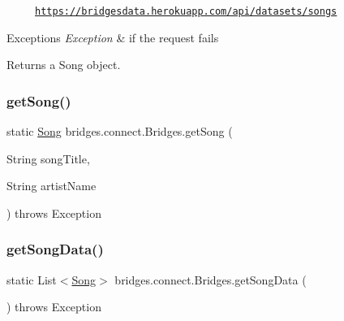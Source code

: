 ~~~~~\href{https://bridgesdata.herokuapp.com/api/datasets/songs}{\tt https\+://bridgesdata.\+herokuapp.\+com/api/datasets/songs} 


\begin{DoxyExceptions}{Exceptions}
{\em Exception} & if the request fails\\
\hline
\end{DoxyExceptions}
\begin{DoxyReturn}{Returns}
a Song object. 
\end{DoxyReturn}
\mbox{\label{classbridges_1_1connect_1_1_bridges_ae7621c3cfd9978aa02fe243317cf0cca}} 
\subsubsection{\texorpdfstring{get\+Song()}{getSong()}\hspace{0.1cm}{\footnotesize\ttfamily [2/2]}}
{\footnotesize\ttfamily static \mbox{\hyperlink{classbridges_1_1data__src__dependent_1_1_song}{Song}} bridges.\+connect.\+Bridges.\+get\+Song (\begin{DoxyParamCaption}\item[{String}]{song\+Title,  }\item[{String}]{artist\+Name }\end{DoxyParamCaption}) throws Exception\hspace{0.3cm}{\ttfamily [static]}}

\mbox{\label{classbridges_1_1connect_1_1_bridges_a5bcfed7f065d3c9da31e3551bf31ec7c}} 
\subsubsection{\texorpdfstring{get\+Song\+Data()}{getSongData()}}
{\footnotesize\ttfamily static List$<$\mbox{\hyperlink{classbridges_1_1data__src__dependent_1_1_song}{Song}}$>$ bridges.\+connect.\+Bridges.\+get\+Song\+Data (\begin{DoxyParamCaption}{ }\end{DoxyParamCaption}) throws Exception\hspace{0.3cm}{\ttfamily [static]}}

